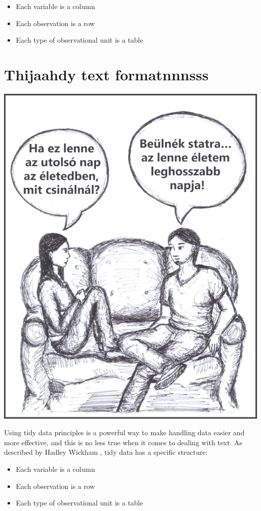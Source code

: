 \documentclass[
]{book}
\providecommand{\tightlist}{%
  \setlength{\itemsep}{0pt}\setlength{\parskip}{0pt}}
\begin{document}
\begin{itemize}
\tightlist
\item
  Each variable is a column
\item
  Each observation is a row
\item
  Each type of observational unit is a table
\end{itemize}

\hypertarget{thijaahdy-text-formatnnnsss}{%
\chapter{Thijaahdy text formatnnnsss}\label{thijaahdy-text-formatnnnsss}}

\begin{center}\includegraphics[width=0.9\linewidth]{images/ch_06_small} \end{center}

Using tidy data principles is a powerful way to make handling data easier and more effective, and this is no less true when it comes to dealing with text. As described by Hadley Wickham \citep{tidydata}, tidy data has a specific structure:

\begin{itemize}
\tightlist
\item
  Each variable is a column
\item
  Each observation is a row
\item
  Each type of observational unit is a table
\end{itemize}
\end{document}
